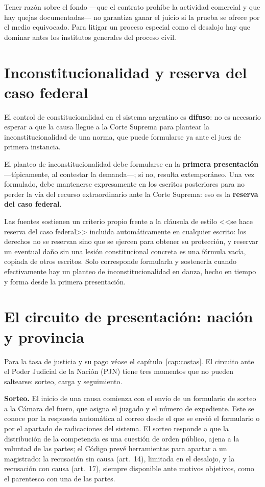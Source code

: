 \documentclass[12pt,oneside]{book}
\begin{document}
\begin{important}
Tener razón sobre el fondo ---que el contrato prohíbe la actividad comercial y que hay quejas documentadas--- no garantiza ganar el juicio si la prueba se ofrece por el medio equivocado. Para litigar un proceso especial como el desalojo hay que dominar antes los institutos generales del proceso civil.
\end{important}

\section{Inconstitucionalidad y reserva del caso federal}

El control de constitucionalidad en el sistema argentino es \textbf{difuso}: no es necesario esperar a que la causa llegue a la Corte Suprema para plantear la inconstitucionalidad de una norma, que puede formularse ya ante el juez de primera instancia.

\begin{important}
El planteo de inconstitucionalidad debe formularse en la \textbf{primera presentación} ---típicamente, al contestar la demanda---; si no, resulta extemporáneo. Una vez formulado, debe mantenerse expresamente en los escritos posteriores para no perder la vía del recurso extraordinario ante la Corte Suprema: eso es la \textbf{reserva del caso federal}.
\end{important}

Las fuentes sostienen un criterio propio frente a la cláusula de estilo <<se hace reserva del caso federal>> incluida automáticamente en cualquier escrito: los derechos no se reservan sino que se ejercen para obtener su protección, y reservar un eventual daño sin una lesión constitucional concreta es una fórmula vacía, copiada de otros escritos. Solo corresponde formularla y sostenerla cuando efectivamente hay un planteo de inconstitucionalidad en danza, hecho en tiempo y forma desde la primera presentación.

\section{El circuito de presentación: nación y provincia}

Para la tasa de justicia y su pago véase el capítulo~\ref{cap:costas}. El circuito ante el Poder Judicial de la Nación (PJN) tiene tres momentos que no pueden saltearse: sorteo, carga y seguimiento.

\textbf{Sorteo.} El inicio de una causa comienza con el envío de un formulario de sorteo a la Cámara del fuero, que asigna el juzgado y el número de expediente. Este se conoce por la respuesta automática al correo desde el que se envió el formulario o por el apartado de radicaciones del sistema. El sorteo responde a que la distribución de la competencia es una cuestión de orden público, ajena a la voluntad de las partes; el Código prevé herramientas para apartar a un magistrado: la recusación sin causa (art.\ 14), limitada en el desalojo, y la recusación con causa (art.\ 17), siempre disponible ante motivos objetivos, como el parentesco con una de las partes.
\end{document}
